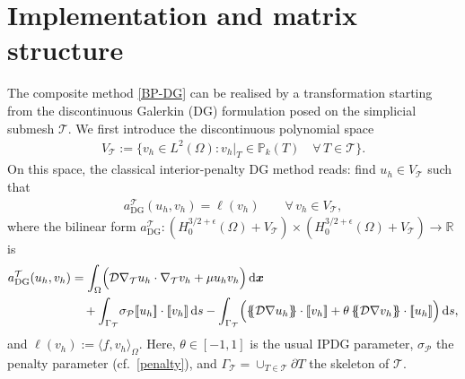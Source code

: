 \documentclass[11pt,final]{amsart}
\theoremstyle{plain}
\theoremstyle{definition}
\newcommand\calP{{\mathcal{P}}}
\newcommand\calT{{\mathcal{T}}}
\newcommand{\mesh}{\calP}
\newcommand{\mean}[1]{\{\kern-1.1mm\{#1\}\kern-1.1mm\}}
\newcommand{\jump}[1]{[\![#1]\!]}                        %
\begin{document}
%

\section{Implementation and matrix structure}\label{Sec:Implementation}

The composite method \eqref{BP-DG} can be realised by a transformation
starting from the discontinuous Galerkin (DG) formulation posed on the
simplicial submesh $\calT$. We first introduce the discontinuous
polynomial space
\begin{align*}
  V_\calT := \bigl\{ v_{h}\in L^{2}(\Omega): v_{h}|_{T}\in \mathbb{P}_{k}(T)
  \quad \forall\, T\in \calT \bigr\}.
\end{align*}
On this space, the classical interior-penalty DG method reads: find
$u_{h}\in V_\calT$ such that
\begin{align}
  a_{\mathrm{DG}}^{\calT}(u_{h},v_{h})
  =
  \ell(v_{h}) \qquad \forall\, v_{h}\in V_\calT, \label{DG121}
\end{align}
where the bilinear form $a_{\mathrm{DG}}^{\calT}:
(H^{3/2+\epsilon}_0(\Omega)+V_\calT)\times(H^{3/2+\epsilon}_0(\Omega)+V_\calT)\to\mathbb{R}$ is
\begin{equation}
  \begin{split}
    a_{\mathrm{DG}}^{\calT}(u_{h},v_{h})
    &=
    \int_{\Omega}\!\Big(\mathcal{D} \nabla_{\calT} u_{h}\cdot\nabla_{\calT} v_{h}
    + \mu u_{h}v_{h}\Big)\,\mathrm{d}\boldsymbol{x}
    \\
    &\quad
    +
    \int_{\Gamma_\calT}\!\sigma_\mesh \jump{u_h}\cdot \jump{v_h}\,\mathrm{d}s
    -
    \int_{\Gamma_{\calT}}\!\Big(\mean{\mathcal{D}\nabla u_h}\cdot \jump{v_h}
    + \theta \,\mean{\mathcal{D}\nabla v_h}\cdot \jump{u_h}\Big)\,\mathrm{d}s, \label{DG11}
  \end{split}
\end{equation}
and $\ell(v_h):=\langle f,v_h\rangle_{\Omega}$. Here, $\theta\in[-1,1]$
is the usual IPDG parameter, $\sigma_\mesh$ the penalty parameter
(cf.~\eqref{penalty}), and $\Gamma_\calT=\cup_{T\in\calT}\partial T$ the
skeleton of $\calT$.
\end{document}
